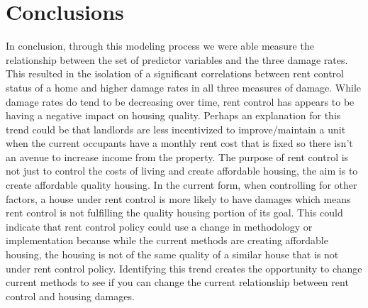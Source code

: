 \documentclass[11pt]{asaproc}\usepackage[]{graphicx}\usepackage[]{color}
\begin{document}
\section{Conclusions\label{conclusions}}
In conclusion, through this modeling process we were able measure the relationship between the set of predictor variables and the three damage rates. This resulted in the isolation of a significant correlations between rent control status of a home and higher damage rates in all three measures of damage.  While damage rates do tend to be decreasing over time, rent control has appears to be having a negative impact on housing quality. Perhaps an explanation for this trend could be that landlords are less incentivized to improve/maintain a unit when the current occupants have a monthly rent cost that is fixed so there isn’t an avenue to increase income from the property. The purpose of rent control is not just to control the costs of living and create affordable housing, the aim is to create affordable quality housing. In the current form, when controlling for other factors, a house under rent control is more likely to have damages which means rent control is not fulfilling the quality housing portion of its goal. This could indicate that rent control policy could use a change in methodology or implementation because while the current methods are creating affordable housing, the housing is not of the same quality of a similar house that is not under rent control policy. Identifying this trend creates the opportunity to change current methods to see if you can change the current relationship between rent control and housing damages.
\end{document}
